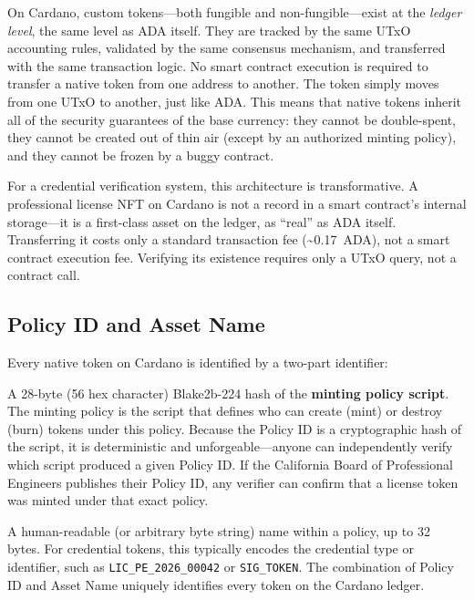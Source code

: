On Cardano, custom tokens---both fungible and non-fungible---exist at
the \emph{ledger level}, the same level as ADA itself. They are tracked
by the same UTxO accounting rules, validated by the same consensus
mechanism, and transferred with the same transaction logic. No smart
contract execution is required to transfer a native token from one
address to another. The token simply moves from one UTxO to another,
just like ADA. This means that native tokens inherit all of the security
guarantees of the base currency: they cannot be double-spent, they
cannot be created out of thin air (except by an authorized minting
policy), and they cannot be frozen by a buggy contract.

For a credential verification system, this architecture is
transformative. A professional license NFT on Cardano is not a record in
a smart contract's internal storage---it is a first-class asset on the
ledger, as ``real'' as ADA itself. Transferring it costs only a standard
transaction fee (\textasciitilde0.17~ADA), not a smart contract
execution fee. Verifying its existence requires only a UTxO query, not a
contract call.

\subsection{Policy ID and Asset Name}

Every native token on Cardano is identified by a two-part identifier:

\begin{description}[leftmargin=1.5cm, labelwidth=1.3cm]
  \item[Policy ID] A 28-byte (56 hex character) Blake2b-224 hash of the
    \textbf{minting policy script}. The minting policy is the script
    that defines who can create (mint) or destroy (burn) tokens under
    this policy. Because the Policy ID is a cryptographic hash of the
    script, it is deterministic and unforgeable---anyone can independently
    verify which script produced a given Policy ID. If the California
    Board of Professional Engineers publishes their Policy ID, any
    verifier can confirm that a license token was minted under that exact
    policy.

  \item[Asset Name] A human-readable (or arbitrary byte string) name
    within a policy, up to 32 bytes. For credential tokens, this
    typically encodes the credential type or identifier, such as
    \texttt{LIC\_PE\_2026\_00042} or \texttt{SIG\_TOKEN}. The
    combination of Policy ID and Asset Name uniquely identifies every
    token on the Cardano ledger.
\end{description}

